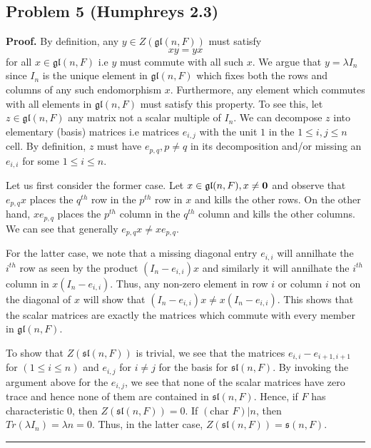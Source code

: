 \documentclass[12pt]{article}%
\newenvironment{proof}[1][Proof]{\textbf{#1.} }{\ \rule{0.5em}{0.5em}}
\begin{document}
\subsection*{Problem 5 (Humphreys 2.3)}
  \begin{proof}
    By definition, any $y \in Z(\mathfrak{gl}(n,F))$ must satisfy
    $$ xy = yx $$ for all $x \in \mathfrak{gl}(n,F)$ i.e $y$ must commute with all such $x$. We argue that $y = \lambda I_n$ since $I_n$ is the unique element in $\mathfrak{gl}(n,F)$ which fixes both the rows and columns of any such endomorphism $x$. Furthermore, any element which commutes with all elements in $\mathfrak{gl}(n,F)$ must satisfy this property. To see this, let $z \in \mathfrak{gl}(n,F)$ any matrix not a scalar multiple of $I_n$. We can decompose $z$ into elementary (basis) matrices i.e matrices $e_{i,j}$ with the unit $1$ in the $1 \leq i,j \leq n$ cell. By definition, $z$ must have $e_{p,q},p\neq q$ in its decomposition and/or missing an $e_{i,i}$ for some $1 \leq i \leq n$. \par

      Let us first consider the former case. Let $x \in \mathfrak{gl}(n,F),x \neq \bold{0}$ and observe that $e_{p,q}x$ places the $q^{th}$ row in the $p^{th}$ row in $x$ and kills the other rows. On the other hand, $xe_{p,q}$ places the $p^{th}$ column in the $q^{th}$ column and kills the other columns. We can see that generally $e_{p,q}x \neq x e_{p,q}$. \par

      For the latter case, we note that a missing diagonal entry $e_{i,i}$ will annilhate the $i^{th}$ row
      as seen by the product $(I_n - e_{i,i})x$ and similarly it will annilhate the $i^{th}$ column in  $x(I_n - e_{i,i})$. Thus, any non-zero element in row $i$ or column $i$ not on the diagonal of $x$ will show that $ (I_n - e_{i,i})x \neq x(I_n - e_{i,i})$. This shows that the scalar matrices are exactly the matrices which commute with every member in $\mathfrak{gl}(n,F)$. \par

      To show that $Z(\mathfrak{sl}(n,F))$ is trivial, we see that the matrices $e_{i,i}-e_{i+1,i+1}$ for $(1 \leq i \leq n)$ and $e_{i,j}$ for $i \neq j$ for the basis for $\mathfrak{sl}(n,F)$. By invoking the argument above for the $e_{i,j}$, we see that none of the scalar matrices have zero trace and hence none of them are contained in $\mathfrak{sl}(n,F)$. Hence, if $F$ has characteristic 0, then $Z(\mathfrak{sl}(n,F)) = 0$. If $(\text{char } F) \vert n$, then $Tr(\lambda I_n) = \lambda n = 0$. Thus, in the latter case, $Z(\mathfrak{sl}(n,F)) = \mathfrak{s}(n,F)$.  \end{proof}
\end{document}
